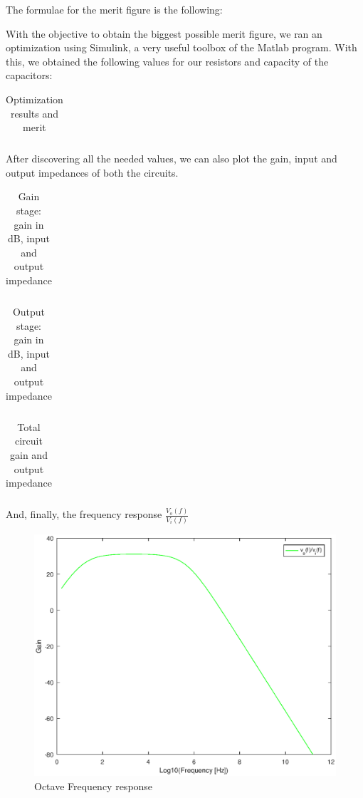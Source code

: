 The formulae for the merit figure is the following:


With the objective to obtain the biggest possible merit figure, we ran an optimization using Simulink, a very useful toolbox of the Matlab program. With this, we obtained the following values for our resistors and capacity of the capacitors:

\begin{table}[H]
\centering
\begin{tabularx}{0.6\textwidth} {
  | >{\raggedright\arraybackslash}X
  | >{\raggedleft\arraybackslash}X | }
 \hline

\end{tabularx}
\caption{Optimization results and merit}
\end{table}

After discovering all the needed values, we can also plot the gain, input and output impedances of both the circuits.

\begin{table}[H]
\centering
\begin{tabularx}{0.6\textwidth} {
  | >{\raggedright\arraybackslash}X
  | >{\raggedleft\arraybackslash}X | }
 \hline

\end{tabularx}
\caption{Gain stage: gain in dB, input and output impedance}
\end{table}

\begin{table}[H]
\centering
\begin{tabularx}{0.6\textwidth} {
  | >{\raggedright\arraybackslash}X
  | >{\raggedleft\arraybackslash}X | }
 \hline

\end{tabularx}
\caption{Output stage: gain in dB, input and output impedance}
\end{table}

\begin{table}[H]
\centering
\begin{tabularx}{0.6\textwidth} {
  | >{\raggedright\arraybackslash}X
  | >{\raggedleft\arraybackslash}X | }
 \hline

\end{tabularx}
\caption{Total circuit gain and output impedance}
\end{table}

And, finally, the frequency response $\frac{V_o(f)}{V_i(f)}$

\begin{figure}[H]\centering
\includegraphics[width=0.7\linewidth]{grafico_octave.eps}
\caption{Octave Frequency response}
\label{fig:snat}
\end{figure}


